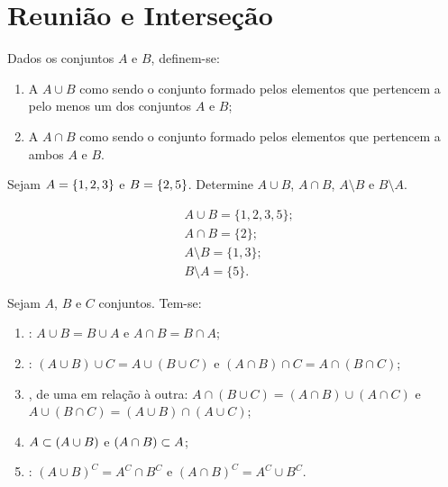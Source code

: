 \section{Reunião e Interseção}

\begin{definition}
Dados os conjuntos $A$ e $B$, definem-se:
%
\begin{enumerate}
	\item A  $A \cup B$ como sendo o conjunto formado pelos elementos que pertencem a pelo menos um dos conjuntos $A$ e $B$;
	\item A  $A \cap B$ como sendo o conjunto formado pelos elementos que pertencem a ambos $A$ e $B$.
\end{enumerate}
\end{definition}

\begin{example}
Sejam $A = \left\{1, 2, 3\right\}$ e $ B = \left\{2,5\right\}$. Determine $A \cup B$, $A \cap B$, $A \setminus B$ e $B \setminus A$.
\end{example}

\begin{solution}
\begin{align*}
	&A \cup B = \{1,2,3,5\};\\
	&A \cap B = \{2\};\\
	&A \setminus B = \{1,3\};\\
	&B \setminus A = \{5\}.
\end{align*}
\end{solution}

\begin{proposition}
Sejam $A$, $B$ e $C$ conjuntos. Tem-se:
\begin{enumerate}
  \item {}: $A \cup B = B \cup A$ e $A \cap B = B \cap A$;
  \item {}: $\left(A \cup B \right) \cup C = A
  \cup \left( B \cup C \right)$ e $\left(A \cap B \right) \cap C = A
  \cap \left( B \cap C \right)$;
  \item {}, de uma em relação à outra: $A \cap
  \left( B \cup C \right) = \left(A \cap B \right) \cup \left( A \cap C
  \right)$ e $A \cup \left( B \cap C \right) = \left(A \cup B \right) \cap
  \left( A \cup C  \right)$;
  \item $A \subset \left(A \cup B\right)$ e $\left(A \cap B\right) \subset A$;
  \item {}: $\left( A \cup B \right)^C = A^C \cap
  B^C$ e $\left(A \cap B \right)^C = A^C \cup B^C$.

  \end{enumerate}
\end{proposition}

